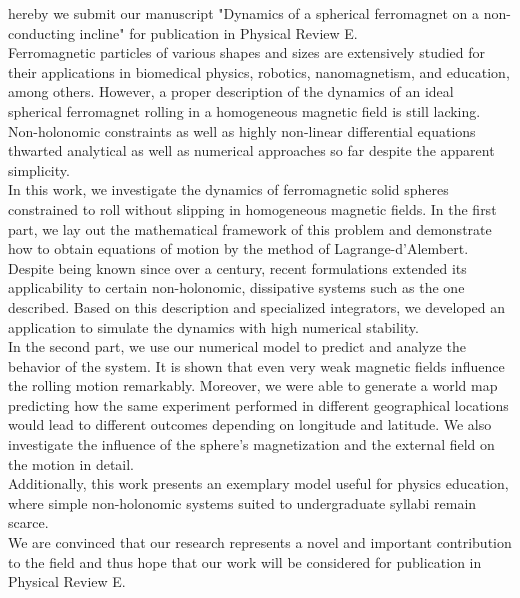 \documentclass[11pt]{article}
\begin{document}

hereby we submit our manuscript "Dynamics of a spherical ferromagnet on a non-conducting incline" for publication in Physical Review E.\\
Ferromagnetic particles of various shapes and sizes are extensively studied for their applications in biomedical physics, robotics, nanomagnetism, and education, among others. However, a proper description of the dynamics of an ideal spherical ferromagnet rolling in a homogeneous magnetic field is still lacking. Non-holonomic constraints as well as highly non-linear differential equations thwarted analytical as well as numerical approaches so far despite the apparent simplicity. \\
In this work, we investigate the dynamics of ferromagnetic solid spheres constrained to roll without slipping in homogeneous magnetic fields. In the first part, we lay out the mathematical framework of this problem and demonstrate how to obtain equations of motion by the method of Lagrange-d'Alembert. Despite being known since over a century, recent formulations extended its applicability to certain non-holonomic, dissipative systems such as the one described. Based on this description and specialized integrators, we developed an application to simulate the dynamics with high numerical stability. \\
In the second part, we use our numerical model to predict and analyze the behavior of the system. It is shown that even very weak magnetic fields influence the rolling motion remarkably. Moreover, we were able to generate a world map predicting how the same experiment performed in different geographical locations would lead to different outcomes depending on longitude and latitude. We also investigate the influence of the sphere's magnetization and the external field on the motion in detail.\\
Additionally, this work presents an exemplary model useful for physics education, where simple non-holonomic systems suited to undergraduate syllabi remain scarce. 
\\
We are convinced that our research represents a novel and important contribution to the field and thus hope that our work will be considered for publication in Physical Review E.

\vspace{1.5em}


\textbf{\senderName} \\

\end{document}
